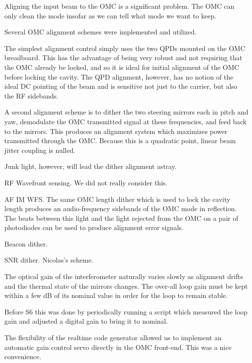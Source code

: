
Aligning the input beam to the OMC is a significant problem.  The OMC
can only clean the mode insofar as we can tell what mode we want to
keep.

Several OMC alignment schemes were implemented and utilized.

The simplest alignment control simply uses the two QPDs mounted on the
OMC breadboard.  This has the advantage of being very robust and not
requiring that the OMC already be locked, and so it is ideal for
initial alignment of the OMC before locking the cavity.  The QPD
alignment, however, has no notion of the ideal DC pointing of the beam
and is sensitive not just to the carrier, but also the RF sidebands.

A second alignment scheme is to dither the two steering mirrors each
in pitch and yaw, demodulate the OMC transmitted signal at these
frequencies, and feed back to the mirrors.  This produces an alignment
system which maximizes power transmitted through the OMC.  Because
this is a quadratic point, linear beam jitter coupling is nulled.

Junk light, however, will lead the dither alignment astray.

RF Wavefront sensing.  We did not really consider this.

AF IM WFS.  The same OMC length dither which is used to lock the cavity
length produces an audio-frequency sidebands of the OMC mode in
reflection.  The beats between this light and the light rejected from
the OMC on a pair of photodiodes can be used to produce alignment
error signals.

Beacon dither.  

SNR dither.  Nicolas's scheme.


The optical gain of the interferometer naturally varies slowly as
alignment drifts and the thermal state of the mirrors changes.  The
over-all loop gain must be kept within a few dB of its nominal value
in order for the loop to remain stable.

Before S6 this was done by periodically running a script which
measured the loop gain and adjusted a digital gain to bring it to
nominal.

The flexibility of the realtime code generator allowed us to implement
an automatic gain control servo directly in the OMC front-end.  This
was a nice convenience. 


